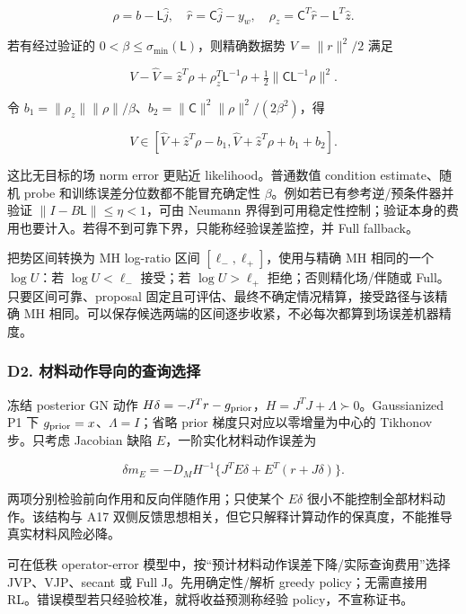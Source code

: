 \documentclass[
  11pt,
  a4paper,
]{article}
\begin{document}
\[\rho=b-\mathsf L\widehat j,\quad
\widehat r=\mathsf C\widehat j-y_w,\quad
\rho_z=\mathsf C^T\widehat r-\mathsf L^T\widehat z.\]

若有经过验证的 \(0<\beta\le\sigma_{\min}(\mathsf L)\)，则精确数据势
\(V=\|r\|^2/2\) 满足

\[V-\widehat V
=\widehat z^T\rho+\rho_z^T\mathsf L^{-1}\rho
+\tfrac12\|\mathsf C\mathsf L^{-1}\rho\|^2.\]

令
\(b_1=\|\rho_z\|\|\rho\|/\beta\)、\(b_2=\|\mathsf C\|^2\|\rho\|^2/(2\beta^2)\)，得

\[V\in[\widehat V+\widehat z^T\rho-b_1,
\widehat V+\widehat z^T\rho+b_1+b_2].\]

这比无目标的场 norm error 更贴近 likelihood。普通数值 condition
estimate、随机 probe 和训练误差分位数都不能冒充确定性
\(\beta\)。例如若已有参考逆/预条件器并验证
\(\|I-B\mathsf L\|\le\eta<1\)，可由 Neumann
界得到可用稳定性控制；验证本身的费用也要计入。若得不到可靠下界，只能称经验误差监控，并
Full fallback。

把势区间转换为 MH log-ratio 区间 \([\ell_-,\ell_+]\)，使用与精确 MH
相同的一个 \(\log U\)：若 \(\log U<\ell_-\) 接受；若 \(\log U>\ell_+\)
拒绝；否则精化场/伴随或 Full。只要区间可靠、proposal
固定且可评估、最终不确定情况精算，接受路径与该精确 MH
相同。可以保存候选两端的区间逐步收紧，不必每次都算到场误差机器精度。

\hypertarget{d2.-ux6750ux6599ux52a8ux4f5cux5bfcux5411ux7684ux67e5ux8be2ux9009ux62e9}{%
\subsubsection{D2.
材料动作导向的查询选择}\label{d2.-ux6750ux6599ux52a8ux4f5cux5bfcux5411ux7684ux67e5ux8be2ux9009ux62e9}}

冻结 posterior GN 动作
\(H\delta=-J^Tr-g_{\rm prior}\)，\(H=J^TJ+\Lambda\succ0\)。Gaussianized
P1 下 \(g_{\rm prior}=x\)、\(\Lambda=I\)；省略 prior
梯度只对应以零增量为中心的 Tikhonov 步。只考虑 Jacobian 缺陷
\(E\)，一阶实化材料动作误差为

\[\delta m_E=-D_MH^{-1}\{J^TE\delta+E^T(r+J\delta)\}.\]

两项分别检验前向作用和反向伴随作用；只使某个 \(E\delta\)
很小不能控制全部材料动作。该结构与 A17
双侧反馈思想相关，但它只解释计算动作的保真度，不能推导真实材料风险必降。

可在低秩 operator-error
模型中，按``预计材料动作误差下降/实际查询费用''选择 JVP、VJP、secant 或
Full J。先用确定性/解析 greedy policy；无需直接用
RL。错误模型若只经验校准，就将收益预测称经验 policy，不宣称证书。
\end{document}
